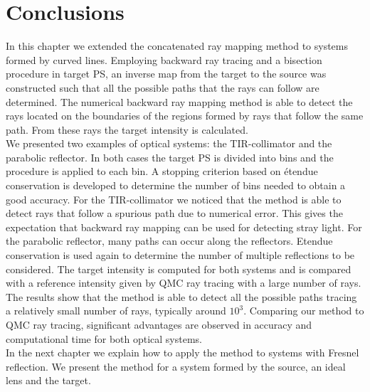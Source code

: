 \section{Conclusions}
In this chapter we extended the concatenated ray mapping method to systems formed by curved lines. Employing backward ray tracing and a bisection procedure in target PS, an inverse map from the target to the source was constructed such that all the possible paths that the rays can follow are determined. The numerical backward ray mapping method is able to detect the rays located on the boundaries of the regions formed by rays that follow the same path. From these rays the target intensity is calculated. 
\\ \indent
We presented two examples of optical systems: the TIR-collimator and the parabolic reflector. In both cases the target PS is divided into bins and the procedure is applied to each bin. A stopping criterion based on \'{e}tendue conservation is developed to determine the number of bins needed to obtain a good accuracy. For the TIR-collimator we noticed that the method is able to detect rays that follow a spurious path due to numerical error. This gives the expectation that backward ray mapping can be used for detecting stray light.
For the parabolic reflector, many paths can occur along the reflectors. Etendue conservation is used again to determine the number of multiple reflections to be considered. The target intensity is computed for both systems and is compared with a reference intensity given by QMC ray tracing with a large number of rays. The results show that the method is able to detect all the possible paths tracing a relatively small number of rays, typically around $10^3$. Comparing our method to QMC ray tracing, significant advantages are observed in accuracy and computational time for both optical systems.
\\ \indent In the next chapter we explain how to apply the method to systems with Fresnel reflection. We present the method for a system formed by the source, an ideal lens and the target. 













